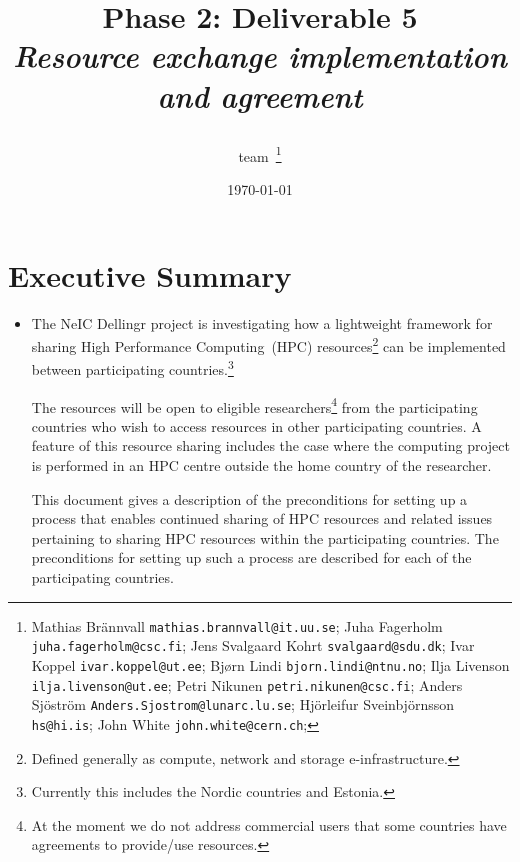 \documentclass{article}
\title{
{\bf \dell Phase 2: Deliverable 5} \\
{\it Resource exchange implementation and agreement}
\author{\dell team~\footnote{ %
Mathias Br{\"a}nnvall {\tt mathias.brannvall@it.uu.se};
Juha Fagerholm {\tt juha.fagerholm@csc.fi};
Jens Svalgaard Kohrt {\tt svalgaard@sdu.dk};
Ivar Koppel {\tt ivar.koppel@ut.ee};
Bj{\o}rn Lindi {\tt bjorn.lindi@ntnu.no};
Ilja Livenson {\tt ilja.livenson@ut.ee};
Petri Nikunen {\tt petri.nikunen@csc.fi};
Anders Sj{\"o}str{\"o}m {\tt Anders.Sjostrom@lunarc.lu.se};
Hj{\"o}rleifur Sveinbj{\"o}rnsson {\tt hs@hi.is};
John White {\tt john.white@cern.ch};
}}}
\date{\today}
\newcommand{\dell}{Dellingr\xspace}
\newcommand{\einfra}{e-infrastructure\xspace}
\begin{document}
\pagestyle{fancy}
\lhead{{\bf \dell Project}}

\maketitle

\newpage
\tableofcontents
\newpage

\section{Executive Summary}
\begin{itemize}
    \item []
    \label{sec-exec-summ}

The NeIC \dell project is investigating how a lightweight framework for sharing High Performance Computing~(HPC) resources\footnote{Defined generally as compute, network and storage \einfra.} can be implemented between participating countries.\footnote{Currently this includes the Nordic countries and Estonia.}

The resources will be open to eligible researchers\footnote{At the moment we do not address commercial users that some countries have agreements to provide/use resources.} from the participating countries who wish to access resources in other participating countries.
A feature of this resource sharing includes the case where the computing project is performed in an HPC centre outside the home country of the researcher.

This document gives a description of the preconditions for setting up a process that enables continued sharing of HPC resources and related issues pertaining to sharing HPC resources within the participating countries. The preconditions for setting up such a process are described for each of the participating countries.
\end{itemize}
\end{document}

